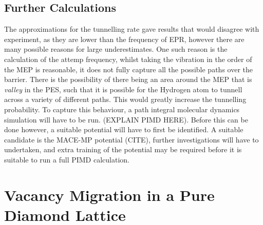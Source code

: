 \documentclass[10pt,a4paper,twocolumn,twoside]{extarticle}
\begin{document}
\subsection{Further Calculations}
The approximations for the tunnelling rate gave results that would disagree with experiment, as they are lower than the frequency of EPR, however there are many possible reasons for large underestimates. One such reason is the calculation of the attemp frequency, whilst taking the vibration in the order of the MEP is reasonable, it does not fully capture all the possible paths over the barrier. There is the possibility of there being an area around the MEP that is \emph{valley} in the PES, such that it is possible for the Hydrogen atom to tunnell across a variety of different paths. This would greatly increase the tunnelling probability. To capture this behaviour, a path integral molecular dynamics simulation will have to be run. (EXPLAIN PIMD HERE). Before this can be done however, a suitable potential will have to first be identified. A suitable candidate is the MACE-MP potential (CITE), further investigations will have to undertaken, and extra training of the potential may be required before it is suitable to run a full PIMD calculation.




\section{Vacancy Migration in a Pure Diamond Lattice}
\end{document}
